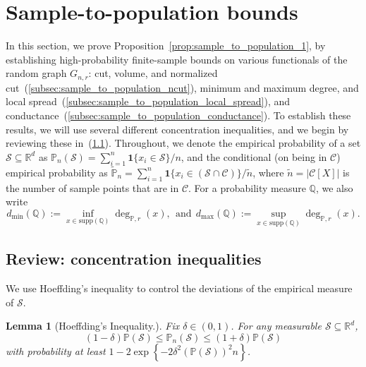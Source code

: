\documentclass{article}
\newcommand{\Reals}{\mathbb{R}}
\newcommand{\set}[1]{\left\{#1\right\}}
\newcommand{\1}{\mathbf{1}}
\newcommand{\Rd}{\Reals^d}
\newcommand{\mc}[1]{\mathcal{#1}}
\newcommand{\mbb}[1]{\mathbb{#1}}
\newcommand{\Pbb}{\mathbb{P}}
\newcommand{\Qbb}{\mathbb{Q}}
\newcommand{\wt}[1]{\widetilde{#1}}
\newtheorem{lemma}{Lemma}[section]
\theoremstyle{definition}
\theoremstyle{remark}
\begin{document}
\section{Sample-to-population bounds}
\label{sec:sample_to_population}
In this section, we prove Proposition~\ref{prop:sample_to_population_1}, by establishing high-probability finite-sample bounds on various functionals of the random graph $G_{n,r}$: cut, volume, and normalized cut~(\ref{subsec:sample_to_population_ncut}), minimum and maximum degree, and local spread~(\ref{subsec:sample_to_population_local_spread}), and conductance~(\ref{subsec:sample_to_population_conductance}). To establish these results, we will use several different concentration inequalities, and we begin by reviewing these in~(\ref{subsec:concentration}). Throughout, we denote the empirical probability of a set $\mc{S} \subseteq \Rd$ as $\Pbb_n(\mc{S}) = \sum_{i = 1}^{n} \1\{x_i \in \mc{S}\}/n$, and the conditional (on being in $\mc{C}$) empirical probability as $\wt{\Pbb}_n = \sum_{i = 1}^{n} \1\{x_i \in (\mc{S} \cap \mc{C})\}/\wt{n}$, where $\wt{n} = |\mc{C}[X]|$ is the number of sample points that are in $\mc{C}$. For a probability measure $\Qbb$, we also write
\begin{equation*}
d_{\min}(\Qbb) := \inf_{x \in \mathrm{supp}(\mbb{Q})} \deg_{\Pbb,r}(x),~~\textrm{and}~~d_{\max}(\Qbb) := \sup_{x \in \mathrm{supp}(\mbb{Q})} \deg_{\Pbb,r}(x).
\end{equation*}

\subsection{Review: concentration inequalities}
\label{subsec:concentration}
We use Hoeffding's inequality to control the deviations of the empirical measure of $\mc{S}$.
\begin{lemma}[Hoeffding's Inequality.]
	\label{lem:hoeffding_2}
	Fix $\delta \in (0,1)$. For any measurable $\mc{S} \subseteq \Rd$,
	\begin{equation*}
	(1 - \delta) \Pbb(\mathcal{S}) \leq \Pbb_n(\mathcal{S}) \leq (1 + \delta)\Pbb(\mathcal{S})
	\end{equation*}
	with probability at least $1 - 2\exp\set{-2\delta^2(\Pbb(\mathcal{S}))^2n}$. 
\end{lemma}
\end{document}
